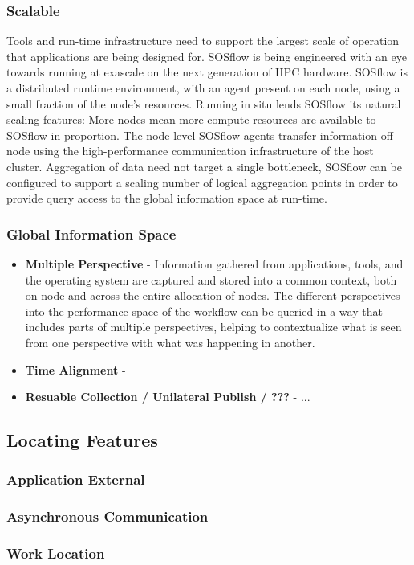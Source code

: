 \subsubsection{Scalable}
%
Tools and run-time infrastructure need to support the largest scale of
operation that applications are being designed for.
%
SOSflow is being engineered with an eye towards running at exascale
on the next generation of HPC hardware.
%
SOSflow is a distributed runtime environment, with an agent present
on each node, using a small fraction of the node's resources.
%
Running in situ lends SOSflow its natural scaling features: More nodes
mean more compute resources are available to SOSflow in proportion.
%
The node-level SOSflow agents transfer information off node using
the high-performance communication infrastructure of the host cluster.
%
Aggregation of data need not target a single bottleneck, SOSflow can
be configured to support a scaling number of logical aggregation points
in order to provide query access to the global information space at
run-time.
%
\subsubsection{Global Information Space}
     \begin{itemize}
        \item \textbf{Multiple Perspective} - Information gathered from
          applications, tools, and the operating system are captured
          and stored into a common context, both on-node and across
          the entire allocation of nodes.  The different perspectives
          into the performance space of the workflow can be queried
          in a way that includes parts of multiple perspectives,
          helping to contextualize what is seen from one perspective
          with what was happening in another.
        \item \textbf{Time Alignment} - 
        \item \textbf{Resuable Collection / Unilateral Publish / ???} - ...
     \end{itemize}
\subsection{Locating Features}
\subsubsection{Application External}
\subsubsection{Asynchronous Communication}
\subsubsection{Work Location}

